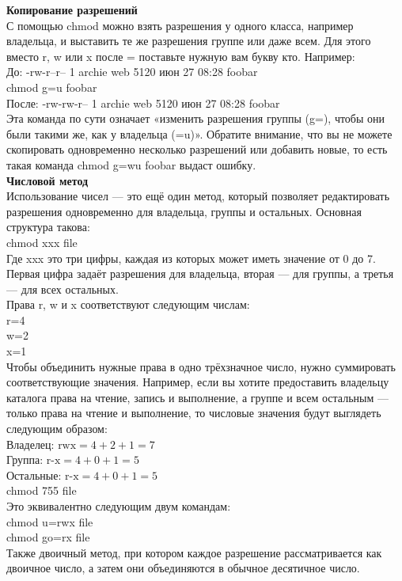 \textbf{Копирование разрешений} \\
С помощью chmod можно взять разрешения у одного класса, например владельца, и выставить те же разрешения группе или даже всем. Для этого вместо r, w или x после = поставьте нужную вам букву кто. Например: \\
До: -rw-r--r-- 1 archie web 5120 июн 27 08:28 foobar \\
chmod g=u foobar \\
После: -rw-rw-r-- 1 archie web 5120 июн 27 08:28 foobar \\
Эта команда по сути означает «изменить разрешения группы (g=), чтобы они были такими же, как у владельца (=u)». Обратите внимание, что вы не можете скопировать одновременно несколько разрешений или добавить новые, то есть такая команда chmod g=wu foobar выдаст ошибку. \\
\textbf{Числовой метод} \\
Использование чисел — это ещё один метод, который позволяет редактировать разрешения одновременно для владельца, группы и остальных. Основная структура такова: \\
chmod xxx file \\
Где xxx это три цифры, каждая из которых может иметь значение от 0 до 7. Первая цифра задаёт разрешения для владельца, вторая — для группы, а третья — для всех остальных. \\
Права r, w и x соответствуют следующим числам: \\
r=4 \\
w=2 \\
x=1 \\
Чтобы объединить нужные права в одно трёхзначное число, нужно суммировать соответствующие значения. Например, если вы хотите предоставить владельцу каталога права на чтение, запись и выполнение, а группе и всем остальным — только права на чтение и выполнение, то числовые значения будут выглядеть следующим образом: \\
Владелец: $\text{rwx}=4+2+1=7$ \\
Группа: $\text{r-x}=4+0+1=5$ \\
Остальные: $\text{r-x}=4+0+1=5$ \\
chmod 755 file \\
Это эквивалентно следующим двум командам: \\
chmod u=rwx file \\
chmod go=rx file \\
Также двоичный метод, при котором каждое разрешение рассматривается как двоичное число, а затем они объединяются в обычное десятичное число. \\
